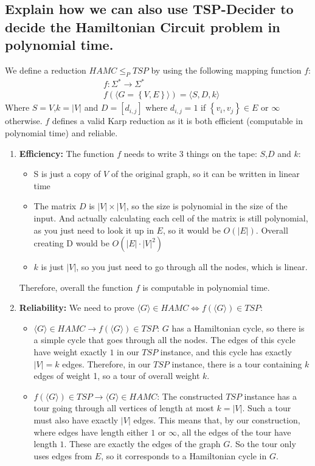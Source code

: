 \documentclass[a4paper,11pt]{article}
\newcommand{\Alphabet}{\Sigma}
\newcommand{\set}[1]{\left\{ #1 \right\}}
\begin{document}
	\subsection{Explain how we can also use TSP-Decider to decide the Hamiltonian Circuit problem in polynomial time.}

	We define a reduction $HAMC \leq_P TSP$ by using the following mapping function $f$:
	\begin{align*}
		&f:\Alphabet^*\to\Alphabet^*\\
		&f(\langle G=\set{V,E}\rangle) = \langle S,D,k\rangle
	\end{align*}
	Where $S=V$,$k=|V|$ and $D=[d_{i,j}]$ where $d_{i,j}=1$ if $\set{v_i,v_j}\in E$ or $\infty$ otherwise.
	$f$ defines a valid Karp reduction as it is both efficient (computable in polynomial time) and reliable.
	\begin{enumerate}
		\item \textbf{Efficiency: }The function $f$ needs to write 3 things on the tape: $S$,$D$ and $k$:
		\begin{itemize}
			\item S is just a copy of $V$ of the original graph, so it can be written in linear time
			\item The matrix $D$ is $|V|\times |V|$, so the size is polynomial in the size of the input. And actually calculating each cell of the matrix is still polynomial, as you just need to look it up in $E$, so it would be $O(|E|)$. Overall creating D would be $O(|E|\cdot|V|^2)$
			\item $k$ is just $|V|$, so you just need to go through all the nodes, which is linear.
		\end{itemize}
		Therefore, overall the function $f$ is computable in polynomial time.
		\item \textbf{Reliability: } We need to prove $\langle G \rangle\in HAMC \iff f(\langle G\rangle)\in TSP$:
		\begin{itemize}
			\item $\langle G \rangle\in HAMC \to f(\langle G\rangle)\in TSP$: $G$ has a Hamiltonian cycle, so there is a simple cycle that goes through all the nodes. The edges of this cycle have weight exactly $1$ in our $TSP$ instance, and this cycle has exactly $|V|=k$ edges. Therefore, in our $TSP$ instance, there is a tour containing $k$ edges of weight 1, so a tour of overall weight $k$.
			\item $f(\langle G\rangle)\in TSP\to \langle G \rangle\in HAMC $: The constructed $TSP$ instance has a tour going through all vertices of length at most $k=|V|$. Such a tour must also have exactly $|V|$ edges. This means that, by our construction, where edges have length either $1$ or $\infty$, all the edges of the tour have length $1$. These are exactly the edges of the graph $G$. So the tour only uses edges from $E$, so it corresponds to a Hamiltonian cycle in $G$.
		\end{itemize}
	\end{enumerate}
\end{document}
